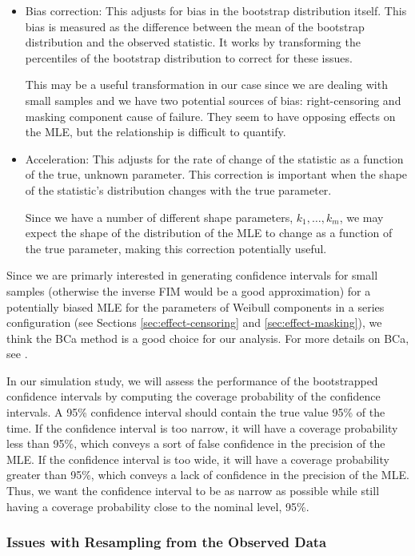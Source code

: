 \documentclass[
]{article}
\begin{document}
\begin{itemize}
\item
  Bias correction: This adjusts for bias in the bootstrap distribution
  itself. This bias is measured as the difference between the mean of
  the bootstrap distribution and the observed statistic. It works by
  transforming the percentiles of the bootstrap distribution to correct
  for these issues.

  This may be a useful transformation in our case since we are dealing
  with small samples and we have two potential sources of bias:
  right-censoring and masking component cause of failure. They seem to
  have opposing effects on the MLE, but the relationship is difficult to
  quantify.
\item
  Acceleration: This adjusts for the rate of change of the statistic as
  a function of the true, unknown parameter. This correction is
  important when the shape of the statistic's distribution changes with
  the true parameter.

  Since we have a number of different shape parameters,
  \(k_1,\ldots,k_m\), we may expect the shape of the distribution of the
  MLE to change as a function of the true parameter, making this
  correction potentially useful.
\end{itemize}

Since we are primarly interested in generating confidence intervals for
small samples (otherwise the inverse FIM would be a good approximation)
for a potentially biased MLE for the parameters of Weibull components in
a series configuration (see Sections \ref{sec:effect-censoring} and
\ref{sec:effect-masking}), we think the BCa method is a good choice for
our analysis. For more details on BCa, see \cite{efron1987better}.

In our simulation study, we will assess the performance of the
bootstrapped confidence intervals by computing the coverage probability
of the confidence intervals. A 95\% confidence interval should contain
the true value 95\% of the time. If the confidence interval is too
narrow, it will have a coverage probability less than 95\%, which
conveys a sort of false confidence in the precision of the MLE. If the
confidence interval is too wide, it will have a coverage probability
greater than 95\%, which conveys a lack of confidence in the precision
of the MLE. Thus, we want the confidence interval to be as narrow as
possible while still having a coverage probability close to the nominal
level, 95\%.

\hypertarget{issues-with-resampling-from-the-observed-data}{%
\subsubsection*{Issues with Resampling from the Observed
Data}\label{issues-with-resampling-from-the-observed-data}}
\end{document}
